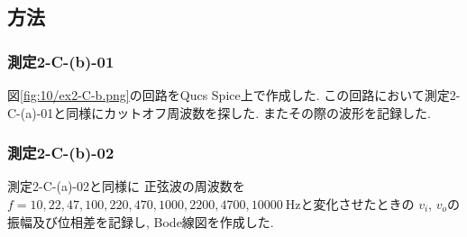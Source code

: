 \subsection{方法}
\subsubsection{測定2-C-(b)-01}
図\ref{fig:10/ex2-C-b.png}の回路をQucs Spice上で作成した.
この回路において測定2-C-(a)-01と同様にカットオフ周波数を探した.
またその際の波形を記録した.
\subsubsection{測定2-C-(b)-02}
測定2-C-(a)-02と同様に
正弦波の周波数を$f=10,22,47,100,220,470,1000,2200,4700,10000\ \si{\hertz}$と変化させたときの
$v_i$, $v_o$の振幅及び位相差を記録し, Bode線図を作成した.